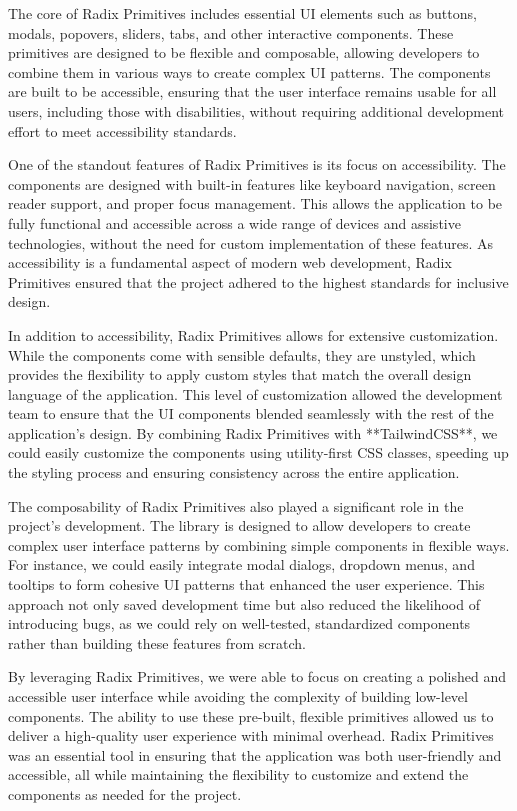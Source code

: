 The core of Radix Primitives includes essential UI elements such as buttons,
modals, popovers, sliders, tabs, and other interactive components. These
primitives are designed to be flexible and composable, allowing developers
to combine them in various ways to create complex UI patterns. The
components are built to be accessible, ensuring that the user interface
remains usable for all users, including those with disabilities, without
requiring additional development effort to meet accessibility standards.

One of the standout features of Radix Primitives is its focus on
accessibility. The components are designed with built{-}in features like
keyboard navigation, screen reader support, and proper focus management.
This allows the application to be fully functional and accessible across a
wide range of devices and assistive technologies, without the need for
custom implementation of these features. As accessibility is a fundamental
aspect of modern web development, Radix Primitives ensured that the project
adhered to the highest standards for inclusive design.

In addition to accessibility, Radix Primitives allows for extensive
customization. While the components come with sensible defaults, they are
unstyled, which provides the flexibility to apply custom styles that match
the overall design language of the application. This level of customization
allowed the development team to ensure that the UI components blended
seamlessly with the rest of the application's design. By combining Radix
Primitives with **TailwindCSS**, we could easily customize the components
using utility{-}first CSS classes, speeding up the styling process and
ensuring consistency across the entire application.

The composability of Radix Primitives also played a significant role in the
project's development. The library is designed to allow developers to create
complex user interface patterns by combining simple components in flexible
ways. For instance, we could easily integrate modal dialogs, dropdown menus,
and tooltips to form cohesive UI patterns that enhanced the user experience.
This approach not only saved development time but also reduced the
likelihood of introducing bugs, as we could rely on well{-}tested,
standardized components rather than building these features from scratch.

By leveraging Radix Primitives, we were able to focus on creating a polished
and accessible user interface while avoiding the complexity of building
low{-}level components. The ability to use these pre{-}built, flexible
primitives allowed us to deliver a high{-}quality user experience with
minimal overhead. Radix Primitives was an essential tool in ensuring that
the application was both user{-}friendly and accessible, all while
maintaining the flexibility to customize and extend the components as needed
for the project.


